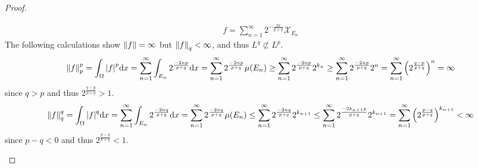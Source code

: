 \documentclass{article} %
\theoremstyle{plain}
\numberwithin{equation}{section} %
\numberwithin{figure}{section} %
\numberwithin{table}{section} %
\begin{document}
\begin{proof}
\begin{enumerate}[ (a)]
            \begin{align*}
                f = \sum_{n=1}^\infty 2^{-\frac{2n}{p+q}}\mathcal{X}_{E_n}
            \end{align*}
            The following calculations show $\norm{f} = \infty$ but $\norm{f}_q < \infty$, and thus $L^q \not\subset L^p$.
            \begin{align*}
                \norm{f}_p^p = \int_\Omega \abs{f}^p\dd x = \sum_{n=1}^\infty \int_{E_n}2^{\frac{-2np}{p+q}}\dd x = \sum_{n=1}^\infty 2^{\frac{-2np}{p+q}}\mu(E_n) \geq \sum_{n=1}^\infty 2^{\frac{-2np}{p+q}}2^{k_n} \geq \sum_{n=1}^\infty 2^{\frac{-2np}{p+q}}2^n = \sum_{n=1}^\infty \qty(2^{\frac{q-p}{p+q}})^n = \infty
            \end{align*}
            since $q > p$ and thus $2^{\frac{q-p}{p+q}} > 1$.
            \begin{align*}
                \norm{f}_q^q = \int_\Omega \abs{f}^q\dd x = \sum_{n=1}^\infty \int_{E_n}2^{\frac{-2nq}{p+q}}\dd x = \sum_{n=1}^\infty 2^{\frac{-2nq}{p+q}}\mu(E_n) \leq \sum_{n=1}^\infty 2^{\frac{-2nq}{p+q}}2^{k_{n+1}} \leq \sum_{n=1}^\infty 2^{\frac{-2k_{n+1}p}{p+q}}2^{k_{n+1}} = \sum_{n=1}^\infty \qty(2^{\frac{p-q}{p+q}})^{k_{n+1}} < \infty
            \end{align*}
            since $p-q < 0$ and thus $2^{\frac{p-q}{p+q}} < 1$.
    \end{enumerate}
\end{proof}
\end{document}
